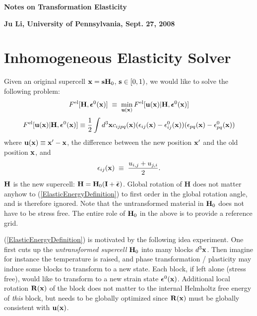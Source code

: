 \documentclass[12pt]{article}
\def\bmath#1{\mbox{\boldmath$#1$}}
\begin{document}


\newcommand{\URL}[1]{\href{#1}{#1}} 

\renewcommand\refname{References \\ ({\small
\URL{http://mt.seas.upenn.edu/Stuff/e/Notes/Paper/}
})}

\centerline{\LARGE\bf Notes on Transformation Elasticity} 

\centerline{\large\bf Ju Li, University of Pennsylvania, Sept. 27, 2008}

\section{Inhomogeneous Elasticity Solver}

Given an original supercell ${\bf x}={\bf s}{\bf H}_0$,
${\bf s}\in[0,1)$, we would like to solve the following problem:
\begin{equation}
 F^{\rm el}[{\bf H}, \bmath{\epsilon}^0({\bf x})] \;\equiv\; 
\min_{{\bf u}({\bf x})} 
F^{\rm el}[{\bf u}({\bf x}) | {\bf H}, \bmath{\epsilon}^0({\bf x})]
\end{equation}
\begin{equation}
F^{\rm el}[{\bf u}({\bf x}) | {\bf H}, \bmath{\epsilon}^0({\bf x})] \equiv
 \frac{1}{2}\int d^3{\bf x} c_{ijpq}({\bf x})
 ( \epsilon_{ij}({\bf x}) - \epsilon^0_{ij}({\bf x}) ) 
 ( \epsilon_{pq}({\bf x}) - \epsilon^0_{pq}({\bf x}) )
 \label{ElasticEnergyDefinition}
\end{equation}
where ${\bf u}({\bf x})\equiv {\bf x}^\prime - {\bf x}$, the
difference between the new position ${\bf x}^\prime$ and the old
position ${\bf x}$, and 
\begin{equation}
 \epsilon_{ij}({\bf x}) \;\equiv\; \frac{u_{i,j}+u_{j,i}}{2}.
 \label{LinearElasticStrainDefinition}
\end{equation}
${\bf H}$ is the new supercell: ${\bf H} = {\bf H}_0
({\bf I}+\bar{\bmath{\epsilon}})$.  Global rotation of {\bf H} does
not matter anyhow to (\ref{ElasticEnergyDefinition}) to first order in
the global rotation angle, and is therefore ignored.  Note that the
untransformed material in ${\bf H}_0$ does not have to be stress free.
The entire role of ${\bf H}_0$ in the above is to provide a reference
grid.

(\ref{ElasticEnergyDefinition}) is motivated by the following idea
experiment.  One first cuts up the {\em untransformed supercell} ${\bf
H}_0$ into many blocks $d^3{\bf x}$.  Then imagine for instance the
temperature is raised, and phase transformation / plasticity may
induce some blocks to transform to a new state.  Each block, if left
alone (stress free), would like to transform to a new strain state
$\bmath{\epsilon}^0({\bf x})$. Additional local rotation ${\bf R}({\bf x})$ of
the block does not matter to the internal Helmholtz free energy of
{\em this} block, but needs to be globally optimized since ${\bf
R}({\bf x})$ must be globally consistent with ${\bf u}({\bf x})$.
\end{document}
